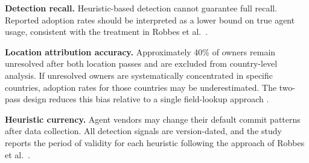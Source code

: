 \documentclass[11pt,a4paper]{article}
\begin{document}
\textbf{Detection recall.} Heuristic-based detection cannot guarantee full recall.
Reported adoption rates should be interpreted as a lower bound on true agent usage,
consistent with the treatment in Robbes et al.~\cite{robbes2026agenticmuch}.

\textbf{Location attribution accuracy.} Approximately 40\% of owners remain unresolved
after both location passes and are excluded from country-level analysis. If unresolved
owners are systematically concentrated in specific countries, adoption rates for those
countries may be underestimated. The two-pass design reduces this bias relative to a
single field-lookup approach \cite{wachs2022geography}.

\textbf{Heuristic currency.} Agent vendors may change their default commit patterns
after data collection. All detection signals are version-dated, and the study reports
the period of validity for each heuristic following the approach of
Robbes et al.~\cite{robbes2026promises}.

\newpage
\end{document}
